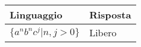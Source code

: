 \documentclass{standalone}
\begin{document}
\begin{tabularx}{\textwidth}{|X |X |}
	\toprule
		Linguaggio & Risposta \\
    \hline
        $\{ a^n b^n c^j | n, j > 0 \}$
        &
				Libero
        \\
    \bottomrule
\end{tabularx}
\end{document}
